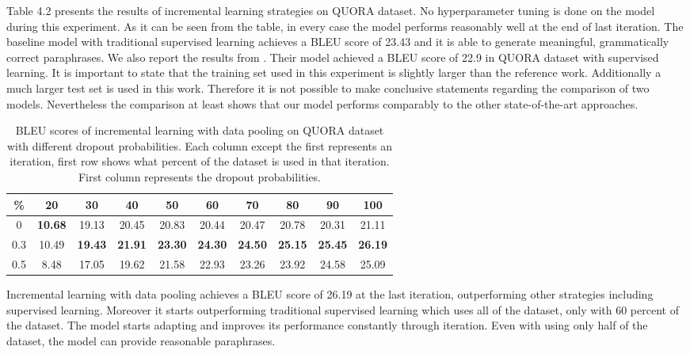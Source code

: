 Table 4.2 presents the results of incremental learning strategies on QUORA dataset. No hyperparameter tuning is done on the model during this experiment. As it can be seen from the table, in every case the model performs reasonably well at the end of last iteration. The baseline model with traditional supervised learning achieves a BLEU score of 23.43 and it is able to generate meaningful, grammatically correct paraphrases. We also report the results from \cite{Guptaetal}. Their model achieved a BLEU score of 22.9 in QUORA dataset with supervised learning. It is important to state that the training set used in this experiment is slightly larger than the reference work. Additionally a much larger test set is used in this work. Therefore it is not possible to make conclusive statements regarding the comparison of two models. Nevertheless the comparison at least shows that our model performs comparably to the other state-of-the-art approaches.

\begin{table}[t]
\centering
\large
\begin{adjustbox}{width=1.2\textwidth,center=\textwidth} 
 \begin{tabular}{|c | c | c | c | c | c | c | c | c | c |} 
 \hline
 \% & 20 & 30 & 40 & 50 & 60 & 70 & 80 & 90 & 100 \\ [0.5ex] 
 \hline
  0 & \textbf{10.68} & 19.13 & 20.45 & 20.83 & 20.44 & 20.47 & 20.78 & 20.31 & 21.11  \\ 
 \hline
  0.3 & 10.49 & \textbf{19.43} & \textbf{21.91} & \textbf{23.30} & \textbf{24.30} & \textbf{24.50} & \textbf{25.15} & \textbf{25.45} & \textbf{26.19} \\ 
 \hline
  0.5 & 8.48 & 17.05 & 19.62 & 21.58 & 22.93 & 23.26 & 23.92 & 24.58 & 25.09 \\ 
 \hline
\end{tabular}
\end{adjustbox}
\caption{BLEU scores of incremental learning with data pooling on QUORA dataset with different dropout probabilities.  Each column except the first represents an iteration, first row shows what percent of the dataset is used in that iteration. First column represents the dropout probabilities.}
\end{table}

Incremental learning with data pooling achieves a BLEU score of 26.19 at the last iteration, outperforming other strategies including supervised learning. Moreover it starts outperforming traditional supervised learning which uses all of the dataset, only with 60 percent of the dataset. The model starts adapting and improves its performance constantly through iteration. Even with using only half of the dataset, the model can provide reasonable paraphrases. 

